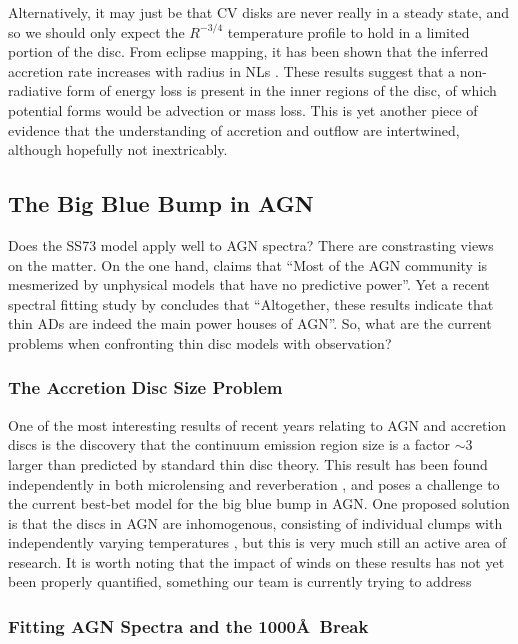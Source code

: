 Alternatively, it may just be that CV disks are never really in
a steady state, and so we should only expect the $R^{-3/4}$
temperature profile to hold in a limited portion of the disc.
From eclipse mapping, it has been shown that the inferred accretion
rate increases with radius in NLs \citep{rutten1992, horne1993}.
These results suggest that a non-radiative form of energy loss
is present in the inner regions of the disc, of which potential forms
would be advection or mass loss. This is yet another piece of evidence
that the understanding of accretion and outflow 
are intertwined, although hopefully not inextricably.

\subsection{The Big Blue Bump in AGN}

Does the SS73 model apply well to AGN spectra? There are constrasting views on the matter.
On the one hand, \cite{antonucci2013} claims that ``Most of the AGN community is mesmerized by unphysical models that have no predictive power''. 
Yet a recent spectral fitting study by \cite{capellupo2015} concludes that 
``Altogether, these results indicate that thin ADs are indeed the 
main power houses of AGN''. So, what are the current problems when 
confronting thin disc models with observation? 

\subsubsection{The Accretion Disc Size Problem}

One of the most interesting results of recent years relating to AGN and accretion discs is
the discovery that the continuum emission region size is a factor $\sim3$ larger than
predicted by standard thin disc theory. This result
has been found independently in both microlensing \citep{morgan2010} 
and reverberation \citep{edelson2015}, and poses a challenge to the 
current best-bet model for the big blue bump in AGN. 
One proposed solution is that the discs in AGN are inhomogenous,
consisting of individual clumps with independently
varying temperatures \citep{dexteragol2011}, but this is very much
still an active area of research. It is worth noting that the impact
of winds on these results has not yet been properly quantified, something
our team is currently trying to address \citep{mangham}

\subsubsection{Fitting AGN Spectra and the 1000\AA\ Break}


